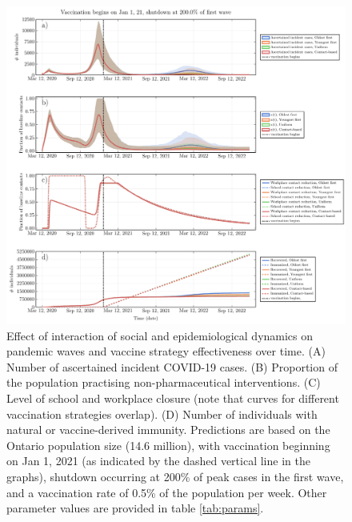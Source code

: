 \begin{figure}
\includegraphics[width=\textwidth]{chapter_3/ts_plot.pdf}
\caption{Effect of interaction of social and epidemiological dynamics on pandemic waves and vaccine strategy effectiveness over time. (A) Number of ascertained incident COVID-19 cases. (B) Proportion of the population practising non-pharmaceutical interventions. (C) Level of school and workplace closure (note that curves for different vaccination strategies overlap). (D) Number of individuals with natural or vaccine-derived immunity. Predictions are based on the Ontario population size (14.6 million), with vaccination beginning on Jan 1, 2021 (as indicated by the dashed vertical line in the graphs), shutdown occurring at 200\% of peak cases in the first wave, and a vaccination rate of 0.5\% of the population per week. Other parameter values are provided in table \ref{tab:params}.}
\label{fig2}  
\end{figure}

